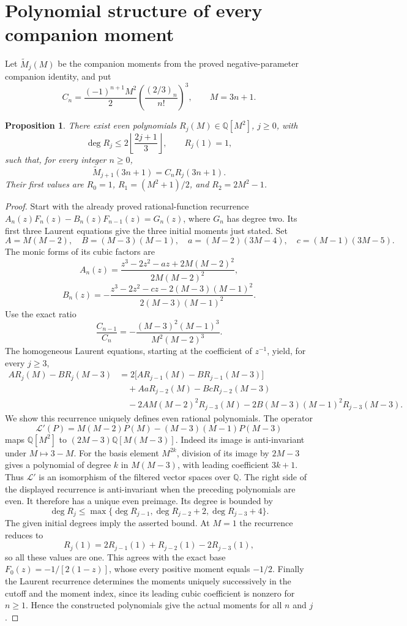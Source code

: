 \documentclass[11pt,letterpaper]{article}
\newtheorem{proposition}[theorem]{Proposition}
\numberwithin{equation}{section}
\begin{document}
\section{Polynomial structure of every companion moment}\label{loc-VIII-6}
\label{VIII-sec:e-companion-polynomials}
Let $\widetilde M_j(M)$ be the companion moments from the proved
negative-parameter companion identity, and put
\[
 C_n=\frac{(-1)^{n+1}M^2}{2}
       \left(\frac{(2/3)_n}{n!}\right)^3,\qquad M=3n+1.
\]
\begin{proposition}\label{VIII-prop:e-companion-polynomials}
There exist even polynomials $R_j(M)\in\mathbb Q[M^2]$, $j\ge0$,
with
\[
 \deg R_j\le2\left\lfloor\frac{2j+1}{3}\right\rfloor,
 \qquad R_j(1)=1,
\]
such that, for every integer $n\ge0$,
\[
 \widetilde M_{j+1}(3n+1)=C_nR_j(3n+1).
\]
Their first values are
$R_0=1$, $R_1=(M^2+1)/2$, and $R_2=2M^2-1$.
\end{proposition}
\begin{proof}
Start with the already proved rational-function recurrence
$A_n(z)F_n(z)-B_n(z)F_{n-1}(z)=G_n(z)$, where $G_n$ has degree two.
Its first three Laurent equations give the three initial moments
just stated. Set
\[
 A=M(M-2),\quad B=(M-3)(M-1),\quad
 a=(M-2)(3M-4),\quad c=(M-1)(3M-5).
\]
The monic forms of its cubic factors are
\[
 A_n(z)=\frac{z^3-2z^2-az+2M(M-2)^2}{2M(M-2)^2},
\]
\[
 B_n(z)=-\frac{z^3-2z^2-cz-2(M-3)(M-1)^2}
                       {2(M-3)(M-1)^2}.
\]
Use the exact ratio
\[
 \frac{C_{n-1}}{C_n}
 =-\frac{(M-3)^2(M-1)^3}{M^2(M-2)^3}.
\]
The homogeneous Laurent equations, starting at the coefficient of
$z^{-1}$, yield, for every $j\ge3$,
\begin{align*}
 A R_j(M)-B R_j(M-3)
 &=2\bigl[A R_{j-1}(M)-B R_{j-1}(M-3)\bigr]\\
 &\quad+A a R_{j-2}(M)-B c R_{j-2}(M-3)\\
 &\quad-2A M(M-2)^2R_{j-3}(M)
       -2B(M-3)(M-1)^2R_{j-3}(M-3).
\end{align*}
We show this recurrence uniquely defines even rational polynomials.
The operator
\[
 \mathcal L'(P)=M(M-2)P(M)-(M-3)(M-1)P(M-3)
\]
maps $\mathbb Q[M^2]$ to $(2M-3)\mathbb Q[M(M-3)]$.
Indeed its image is anti-invariant under $M\mapsto3-M$.
For the basis element $M^{2k}$, division of its image by $2M-3$
gives a polynomial of degree $k$ in $M(M-3)$, with leading
coefficient $3k+1$. Thus $\mathcal L'$ is an isomorphism of the
filtered vector spaces over $\mathbb Q$.
The right side of the displayed recurrence is anti-invariant when
the preceding polynomials are even. It therefore has a unique even
preimage. Its degree is bounded by
\[
 \deg R_j\le\max\{\deg R_{j-1},\deg R_{j-2}+2,
                                    \deg R_{j-3}+4\}.
\]
The given initial degrees imply the asserted bound.
At $M=1$ the recurrence reduces to
\[
 R_j(1)=2R_{j-1}(1)+R_{j-2}(1)-2R_{j-3}(1),
\]
so all these values are one. This agrees with the exact base
$F_0(z)=-1/[2(1-z)]$, whose every positive moment equals $-1/2$.
Finally the Laurent recurrence determines the moments uniquely
successively in the cutoff and the moment index, since its leading
cubic coefficient is nonzero for $n\ge1$. Hence the constructed
polynomials give the actual moments for all $n$ and $j$.
\end{proof}
\end{document}
